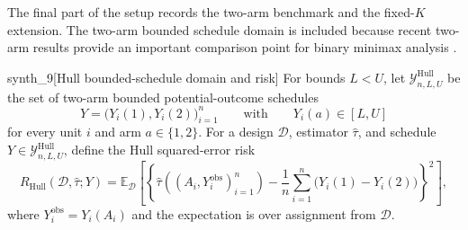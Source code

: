 \documentclass[11pt]{article}
\begin{document}
The final part of the setup records the two-arm benchmark and the fixed-\(K\) extension. The two-arm bounded schedule domain is included because recent two-arm results provide an important comparison point for binary minimax analysis \citep{sudijono_dobriban_tchetgen_2026_sharp,hull_2026_bounded}.

\begin{definitionv}{synth_9}[Hull bounded-schedule domain and risk]
For bounds \(L<U\), let \(\mathcal Y^{\mathrm{Hull}}_{n,L,U}\) be the set of two-arm bounded potential-outcome schedules
\[
Y=\bigl(Y_i(1),Y_i(2)\bigr)_{i=1}^n
\qquad\text{with}\qquad
Y_i(a)\in[L,U]
\]
for every unit \(i\) and arm \(a\in\{1,2\}\). For a design \(\mathcal D\), estimator \(\widehat\tau\), and schedule \(Y\in\mathcal Y^{\mathrm{Hull}}_{n,L,U}\), define the Hull squared-error risk
\[
R_{\mathrm{Hull}}(\mathcal D,\widehat\tau;Y)
=\mathbb E_{\mathcal D}\left[\left\{\widehat\tau((A_i,Y_i^{\mathrm{obs}})_{i=1}^n)-\frac1n\sum_{i=1}^n\bigl(Y_i(1)-Y_i(2)\bigr)\right\}^2\right],
\]
where \(Y_i^{\mathrm{obs}}=Y_i(A_i)\) and the expectation is over assignment from \(\mathcal D\).
\end{definitionv}
\end{document}
